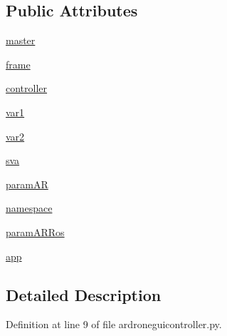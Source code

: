 \subsection*{Public Attributes}
\begin{DoxyCompactItemize}
\item 
\hyperlink{classardroneguicontroller_1_1ardroneGUIController_abdc76d5b11b7c5286a9ee3603d5c87e6}{master}
\item 
\hyperlink{classardroneguicontroller_1_1ardroneGUIController_a05649f2dcee17b7841468273e9d245de}{frame}
\item 
\hyperlink{classardroneguicontroller_1_1ardroneGUIController_a997e607f6b65bc91790c1e4e2f96baa7}{controller}
\item 
\hyperlink{classardroneguicontroller_1_1ardroneGUIController_a63bd23277a5f31cdc1f1465c4222c389}{var1}
\item 
\hyperlink{classardroneguicontroller_1_1ardroneGUIController_a49406520dc109e05132990d2f0a5fd10}{var2}
\item 
\hyperlink{classardroneguicontroller_1_1ardroneGUIController_a2da70796992fd86e7caac4a30f1fc60c}{sva}
\item 
\hyperlink{classardroneguicontroller_1_1ardroneGUIController_a7b512aedc151052e8b1d37eb0b729329}{param\-A\-R}
\item 
\hyperlink{classardroneguicontroller_1_1ardroneGUIController_a5fbc328816571381251655871d86b70e}{namespace}
\item 
\hyperlink{classardroneguicontroller_1_1ardroneGUIController_ad33c0ce0f9c7165b3f13902fb442d4cf}{param\-A\-R\-Ros}
\item 
\hyperlink{classardroneguicontroller_1_1ardroneGUIController_ac902183e41baa2da5bde3b9c02c0031a}{app}
\end{DoxyCompactItemize}


\subsection{Detailed Description}


Definition at line 9 of file ardroneguicontroller.\-py.



